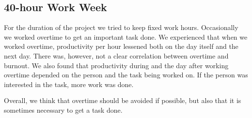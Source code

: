 \subsection{40-hour Work Week}
For the duration of the project we tried to keep fixed work hours. Occasionally we worked overtime to get an important task done. We experienced that when we worked overtime, productivity per hour lessened both on the day itself and the next day. There was, however, not a clear correlation between overtime and burnout. We also found that productivity during and the day after working overtime depended on the person and the task being worked on. If the person was interested in the task, more work was done. 

Overall, we think that overtime should be avoided if possible, but also that it is sometimes necessary to get a task done.